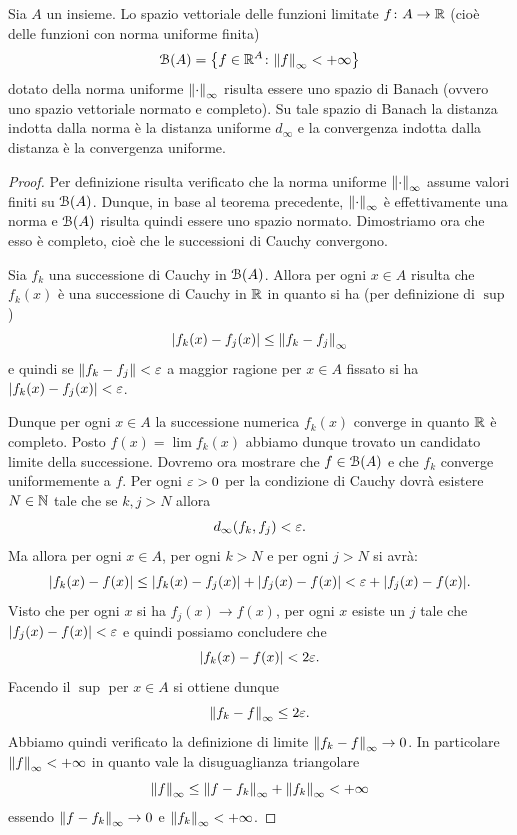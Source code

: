 \begin{theorem}%
  \label{th:limitate_completo}%
Sia $A$ un insieme.
Lo spazio vettoriale
delle funzioni limitate $f\colon A \to {\mathbb R}$
(cioè delle funzioni con norma uniforme finita)
\[
  \mathcal B(A) = {\left\{ f\in {\mathbb R}^A\colon {\left\Vert f\right\Vert}_\infty < +\infty  \right\}}
\]
dotato della norma uniforme ${\left\Vert \cdot\right\Vert}_\infty$ risulta essere uno spazio di Banach (ovvero uno spazio vettoriale normato e completo).
Su tale spazio di Banach la distanza indotta dalla norma è la distanza uniforme $d_\infty$ e la convergenza indotta dalla distanza è la convergenza uniforme.
\end{theorem}
%
\begin{proof}
Per definizione risulta verificato che la norma uniforme ${\left\Vert \cdot\right\Vert}_\infty$ assume valori finiti su $\mathcal B(A)$.
Dunque, in base al teorema precedente, ${\left\Vert \cdot\right\Vert}_\infty$ è effettivamente una norma e $\mathcal B(A)$ risulta quindi essere uno spazio normato. Dimostriamo ora che esso è completo, cioè che le successioni di Cauchy convergono.

Sia $f_k$ una successione di Cauchy in $\mathcal B(A)$.
Allora per ogni $x\in A$ risulta che $f_k(x)$ è una successione di Cauchy in ${\mathbb R}$ in quanto si ha (per definizione di $\sup$)
\[
  {\left|f_k(x) - f_j(x)\right|} \le {\left\Vert f_k - f_j\right\Vert}_\infty
\]
e quindi se ${\left\Vert f_k- f_j\right\Vert} < \varepsilon$
a maggior ragione per $x\in A$ fissato si ha ${\left|f_k(x)-f_j(x)\right|} < \varepsilon$.

Dunque per ogni $x\in A$ la successione numerica $f_k(x)$ converge in quanto ${\mathbb R}$ è completo. Posto $f(x) = \lim f_k(x)$ abbiamo dunque trovato un candidato limite della successione.
Dovremo ora mostrare che $f\in \mathcal B(A)$ e che $f_k$ converge uniformemente a $f$.
Per ogni $\varepsilon>0$ per la condizione di Cauchy dovrà esistere $N\in {\mathbb N}$ tale che se $k,j>N$ allora
\[
  d_\infty(f_k,f_j) < \varepsilon.
\]
Ma allora per ogni $x\in A$, per ogni $k>N$ e per ogni $j>N$ si avrà:
\[
  {\left|f_k(x) - f(x)\right|} \le {\left|f_k(x) - f_j(x)\right|} +
  {\left|f_j(x) - f(x)\right|} < \varepsilon + {\left|f_j(x)-f(x)\right|}.
\]
Visto che per ogni $x$ si ha $f_j(x) \to f(x)$, per ogni $x$ esiste un $j$ tale che ${\left|f_j(x)-f(x)\right|} < \varepsilon$ e quindi possiamo concludere che
\[
  {\left|f_k(x)-f(x)\right|} < 2\varepsilon.
\]
Facendo il $\sup$ per $x\in A$ si ottiene dunque
\[
  {\left\Vert f_k -f\right\Vert}_\infty \le 2 \varepsilon.
\]
Abbiamo quindi verificato la definizione di limite ${\left\Vert f_k -f\right\Vert}_\infty\to 0$. In particolare ${\left\Vert f\right\Vert}_\infty < +\infty$ in quanto vale la disuguaglianza triangolare
\[
  {\left\Vert f\right\Vert}_\infty \le {\left\Vert f-f_k\right\Vert}_\infty + {\left\Vert f_k\right\Vert}_\infty < +\infty
\]
essendo ${\left\Vert f-f_k\right\Vert}_\infty \to 0$ e ${\left\Vert f_k\right\Vert}_\infty < +\infty$.
\end{proof}

